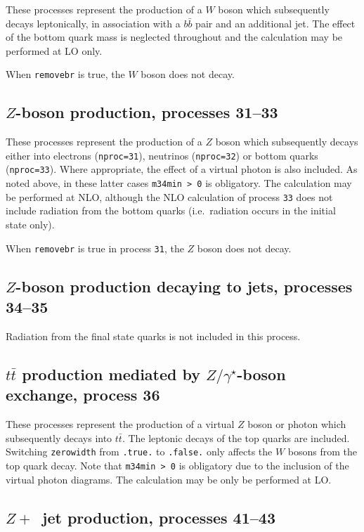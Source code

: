 \documentclass[12pt]{article}
\begin{document}
These processes represent the production of a $W$ boson which subsequently
decays leptonically, in association with a $b{\bar b}$ pair and an
additional jet. The effect of the bottom quark mass is neglected throughout
and the calculation may be performed at LO only.

When {\tt removebr} is true, the $W$ boson does not decay.

\subsection{$Z$-boson production, processes 31--33}
\label{subsec:zboson}

These processes represent the production of a $Z$ boson which subsequently
decays either into electrons ({\tt nproc=31}), neutrinos ({\tt nproc=32})
or bottom quarks ({\tt nproc=33}). Where appropriate, the effect of a virtual
photon is also included. As noted above, in these latter cases {\tt m34min > 0}
is obligatory. The calculation may be performed at NLO,
although the NLO calculation of process {\tt 33} does not include radiation
from the bottom quarks (i.e.\ radiation occurs in the initial state only).

When {\tt removebr} is true in process {\tt 31}, the $Z$ boson does not decay.

\subsection{$Z$-boson production decaying to jets, processes 34--35}
Radiation from the final state quarks is not included in this process.

\subsection{$t \bar{t}$ production mediated by $Z/\gamma^\star$-boson exchange, process 36}

These processes represent the production of a virtual $Z$ boson or photon 
which subsequently decays into $t \bar{t}$.
The leptonic decays of the top quarks are included.
Switching {\tt zerowidth} from {\tt .true.} to {\tt .false.} only affects
the $W$ bosons from the top quark decay.
Note that {\tt m34min > 0} is obligatory due to the inclusion of the
virtual photon diagrams. The calculation may be only be performed at LO.


\subsection{$Z+$~jet production, processes 41--43}
\label{subsec:zjet}
\end{document}
